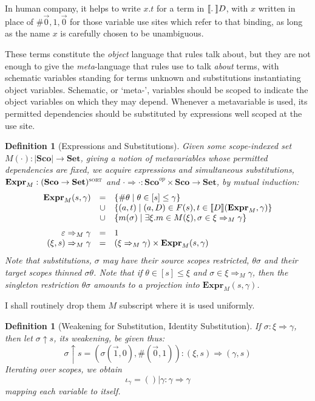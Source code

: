 \documentclass[format=acmsmall, screen, review, anonymous, timestamp]{acmart}
\newtheorem{defn}[thm]{Definition}
\newcommand{\emp}{\varepsilon}
\newcommand{\op}{^{op}}
\begin{document}
In human company, it helps to write $x.t$ for a term in $\sem\db D$,
with $x$ written in place of $\#\vec0,1,\vec0$ for those variable use
sites which refer to that binding, as long as the name $x$ is
carefully chosen to be unambiguous.

These terms constitute the \emph{object} language that rules talk
about, but they are not enough to give the \emph{meta}-language that
rules use to talk \emph{about} terms, with schematic variables
standing for terms unknown and substitutions instantiating object
variables. Schematic, or `meta-', variables should be scoped to
indicate the object variables on which they may depend. Whenever a
metavariable is used, its permitted dependencies should be substituted
by expressions well scoped at the use site.

\newcommand{\Sb}{\Rightarrow}
\begin{defn}[Expressions and Substitutions]
 Given some scope-indexed set $M(\cdot) :
|\textbf{Sco}|\to\textbf{Set}$, giving a notion of
metavariables whose permitted dependencies are fixed, we
acquire expressions and simultaneous substitutions, $\textbf{Expr}_M:
(\textbf{Sco}\to\textbf{Set})^{\textsc{sort}}$ and
$\cdot\Sb\cdot :
\textbf{Sco}\op\times\textbf{Sco}\to\textbf{Set}$,
by mutual induction:
  \[\begin{array}{rcl}
      \textbf{Expr}_M(s, \gamma)
        &=& \{\#\theta\st\theta\in[s]\le \gamma\}\\
        &\cup& \{(a,t) \st (a,D)\in F(s),
               t\in\sem{D}(\textbf{Expr}_M,\gamma)\}\\
        &\cup& \{m(\sigma) \st \exists \xi. m\in M(\xi), \sigma\in
               \xi\Sb_M\gamma\}\medskip\\
      \emp\Sb_M\gamma & = & 1 \\
      (\xi,s)\Sb_M\gamma & = & (\xi\Sb_M\gamma)\times \textbf{Expr}_M(s,
                             \gamma) 
  \end{array}\]
Note that substitutions, $\sigma$ may have their source scopes
restricted, $\theta\sigma$ and
their target scopes thinned $\sigma\theta$. Note that if
$\theta\in[s]\le\xi$ and $\sigma\in\xi\Sb_M\gamma$, then the
singleton restriction $\theta\sigma$ amounts to a projection into
$\textbf{Expr}_M(s,\gamma)$.
\end{defn}

I shall routinely drop them $M$ subscript where it is used uniformly.

\newcommand{\wks}[2]{#1\!\uparrow\!#2}
\begin{defn}[Weakening for Substitution, Identity Substitution]
If $\sigma : \xi\Sb\gamma$, then let $\wks\sigma s$, its \emph{weakening},
be given thus:
\[
  \wks\sigma s = (\sigma(\vec1,0), \#(\vec0,1)) : (\xi,s)\Sb(\gamma,s)
\]
Iterating over scopes, we obtain
\[
  \iota_\gamma = ()|\gamma : \gamma\Sb\gamma
\]
mapping each variable to itself.
\end{defn}
\end{document}
